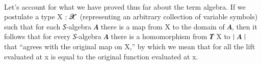 \begin{code}
\AgdaSymbol{(}\AgdaSpace{}%
\AgdaSpace{}%
\AgdaSymbol{)}\AgdaSpace{}%
\AgdaSymbol{(}\AgdaSpace{}%
\AgdaSpace{}%
\AgdaSpace{}%
\AgdaSpace{}%
\AgdaSymbol{)}\AgdaSpace{}%
\AgdaSpace{}%
\AgdaSymbol{(}\AgdaSpace{}%
\AgdaSpace{}%
\AgdaSymbol{)}\AgdaSpace{}%
\AgdaSymbol{(}\AgdaSpace{}%
\AgdaSpace{}%
\AgdaSpace{}%
\AgdaSpace{}%
\AgdaSymbol{)}\<%
\\
%
\>[2]\AgdaSpace{}%
\AgdaSymbol{=}\AgdaSpace{}%
\AgdaSpace{}%
\AgdaSymbol{(}\AgdaSpace{}%
\AgdaSpace{}%
\AgdaSymbol{)}\AgdaSpace{}%
\AgdaSymbol{(}\AgdaSpace{}%
\AgdaSpace{}%
\AgdaSpace{}%
\AgdaSpace{}%
\AgdaSpace{}%
\AgdaSpace{}%
\AgdaSpace{}%
\AgdaSpace{}%
\AgdaSpace{}%
\AgdaSpace{}%
\AgdaSymbol{(}\AgdaSpace{}%
\AgdaSymbol{))}\<%
\end{code}
\ccpad
Let's account for what we have proved thus far about the term algebra.  If we
postulate a type \ab X \as : \ab 𝓧 \af ̇ (representing an arbitrary collection of
variable symbols) such that for each \ab 𝑆-algebra \ab 𝑨 there is a map from \ab
X to the domain of \ab 𝑨, then it follows that for every \ab 𝑆-algebra \ab 𝑨
there is a homomorphism from \af 𝑻 \ab X to \af ∣ \ab 𝑨 \af ∣ that ``agrees with
the original map on \ab X,'' by which we mean that for all  the lift
evaluated at  \ab x is equal to the original function evaluated
at \ab x.

